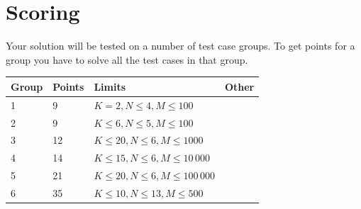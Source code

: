\section*{Scoring}
Your solution will be tested on a number of test case groups. To get points for a group
you have to solve all the test cases in that group.

\begin{tabular}{| l | l | l | l |}
\hline
Group & Points & Limits & Other \\ \hline
	1     & 9          & $K = 2, N \le 4, M \le 100$ \\ \hline
	2     & 9          & $K \le 6, N \le 5, M \le 100$ \\ \hline
	3     & 12         & $K \le 20, N \le 6, M \le 1000$ \\ \hline
	4     & 14         & $K \le 15, N \le 6, M \le 10\,000$ \\ \hline
	5     & 21         & $K \le 20, N \le 6, M \le 100\,000$ \\ \hline
	6     & 35         & $K \le 10, N \le 13, M \le 500$ \\ \hline
\end{tabular}
